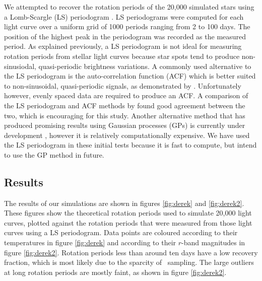 We attempted to recover the rotation periods of the 20,000 simulated stars
using a Lomb-Scargle (LS) periodogram \citep[][]{Lomb1976, Scargle1982}.
LS periodograms were computed for each light curve over a uniform grid of 1000
periods ranging from 2 to 100 days.
The position of the highest peak in the periodogram was recorded as the
measured period.
As explained previously, a LS periodogram is not ideal for measuring rotation
periods from stellar light curves because star spots tend to produce
non-sinusiodal, quasi-periodic brightness variations.
A commonly used alternative to the LS periodogram is the auto-correlation
function (ACF) which is better suited to non-sinusoidal, quasi-periodic
signals, as demonstrated by \citet{Mcquillan2013}.
Unfortunately however, evenly spaced data are required to produce an ACF.
A comparison of the LS periodogram and ACF methods by \citet{Aigrain2015b}
found good agreement between the two, which is encouraging for this study.
Another alternative method that has produced promising results using Gaussian
processes (GPs) is currently under development \citep{Angus2015b}, however it
is relatively computationally expensive.
We have used the LS periodogram in these initial tests because it is fast to
compute, but intend to use the GP method in future.

\subsection{Results}
\label{sec:LSST_results}

The results of our simulations are shown in figures \ref{fig:derek} and
\ref{fig:derek2}.
These figures show the theoretical rotation periods used to simulate 20,000
light curves, plotted against the rotation periods that were measured from
those light curves using a LS periodogram.
Data points are coloured according to their temperatures in figure
\ref{fig:derek} and according to their $r$-band magnitudes in figure
\ref{fig:derek2}.
Rotation periods less than around ten days have a low recovery fraction, which
is most likely due to the sparcity of \LSST\ sampling.
The large outliers at long rotation periods are mostly faint, as shown in
figure \ref{fig:derek2}.

